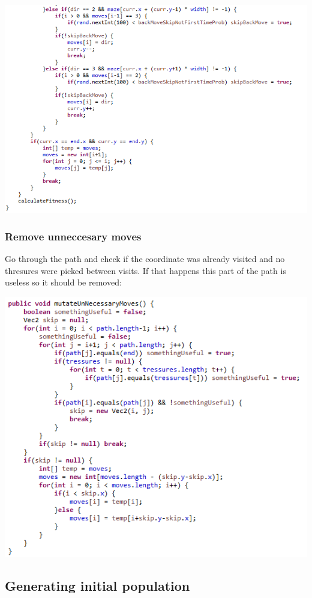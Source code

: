 \documentclass[12pt]{article} %
\begin{document}
\includegraphics[scale=1]{randomMovePathCorrectionMutation3}

\subsubsection{Remove unneccesary moves}
Go through the path and check if the coordinate was already visited and no thresures were picked between visits. If that happens this part of the path
is useless so it should be removed:

\includegraphics[scale=1]{removeUnNeccesaryMovesMutation}


\subsection{Generating initial population}
\end{document}

